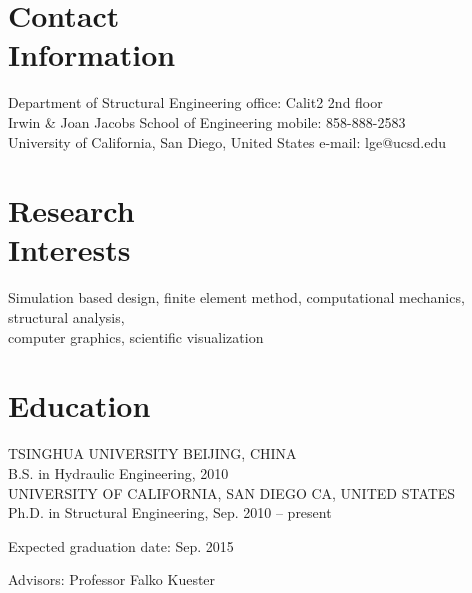 \documentclass[margin,line]{resume}
\begin{document}
\begin{resume}
	\section{\mysidestyle Contact\\Information}
	Department of Structural Engineering \hfill office: Calit2 2nd floor
	\vspace{0mm}\\\vspace{0mm}%
	Irwin \& Joan Jacobs School of Engineering \hfill mobile: 858-888-2583
	\vspace{0mm}\\\vspace{0mm}%
	University of California, San Diego, United States \hfill e-mail: lge@ucsd.edu
	\vspace{0mm}\\\vspace{-4.5mm}%

	\section{\mysidestyle Research\\Interests}

	Simulation based design, finite element method, computational mechanics, structural analysis, \\
	computer graphics, scientific visualization  

	\section{\mysidestyle Education}
	TSINGHUA UNIVERSITY \hfill BEIJING, CHINA
	\vspace{1mm}\\\vspace{1mm}%
	B.S. in Hydraulic Engineering, 2010
	\vspace{3mm}\\%
	UNIVERSITY OF CALIFORNIA, SAN DIEGO \hfill CA, UNITED STATES
	\vspace{1mm}\\\vspace{1mm}%
	Ph.D. in Structural Engineering, Sep. 2010 -- present
	\vspace{-3mm}\\\vspace{-1mm}%
	\begin{list2}
		\item Expected graduation date:  Sep. 2015
		\item Advisors:  Professor Falko Kuester
	\end{list2}


\end{resume}
\end{document}
